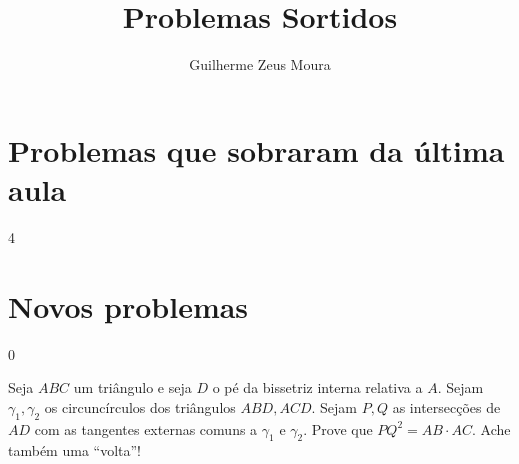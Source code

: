 \documentclass[11pt,a4paper]{article}
\title{Problemas Sortidos}
\author{Guilherme Zeus Moura}
\begin{document}
	
	\zeustitle

	\section{Problemas que sobraram da última aula}
	\setcounter{prob}4

	\section{Novos problemas}
	\setcounter{prob}0
	\begin{prob}
		Seja $ABC$ um triângulo e seja $D$ o pé da bissetriz interna relativa a $A$. Sejam $\gamma_1, \gamma_2$ os circuncírculos dos triângulos $ABD, ACD$. Sejam $P, Q$ as intersecções de $AD$ com as tangentes externas comuns a $\gamma_1$ e  $\gamma_2$. Prove que $PQ^2 = AB \cdot AC$. Ache também uma ``volta''!
	\end{prob}
\end{document}
